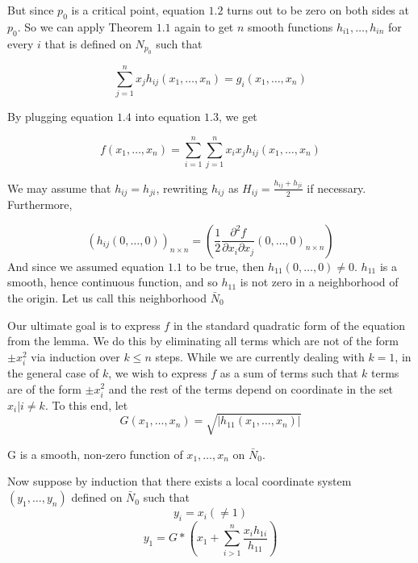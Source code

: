 \documentclass[]{article}
\begin{document}
     But since $p_0$ is a critical point, equation $1.2$ turns out to be zero on both 
     sides at $p_0$. So we can apply Theorem $1.1$ again to get $n$ smooth functions 
     $h_{i1},\ldots,h_{in}$ for every $i$ that is defined on $N_{p_0}$ such that

     \begin{equation}
        \sum_{j=1}^{n}{x_jh_{ij}(x_1,\ldots,x_n)}=g_i(x_1,\ldots,x_n) \tag{1.4}
     \end{equation}

     By plugging equation $1.4$ into equation $1.3$, we get

     \begin{equation}
        f(x_1,\ldots,x_n)=\sum_{i=1}^{n}\sum_{j=1}^{n}{x_ix_jh_{ij}(x_1,\ldots,x_n)} \tag{1.5}
     \end{equation}

     We may assume that $h_{ij}=h_{ji}$, rewriting $h_{ij}$ as
     $H_{ij}=\frac{h_{ij}+h_{ji}}{2}$ if necessary. Furthermore,

     \begin{equation}
        (h_{ij}(0,\ldots,0))_{n \times n}=\left( \frac{1}{2}\frac{\partial^2f}{\partial x_i \partial x_j}(0,\ldots,0)_{n\times n} \right) \tag{1.6}
     \end{equation} 
     And since we assumed equation $1.1$ to be true, then $h_{11}(0,\ldots,0)\not = 0$. $h_{11}$
     is a smooth, hence continuous function, and so $h_{11}$ is not zero in a neighborhood of the origin.
     Let us call this neighborhood $\bar{N}_0$    

     Our ultimate goal is to express $f$ in the standard quadratic form of the equation from the lemma.
     We do this by eliminating all terms which are not of the form $\pm x_i^2$ via induction over $k\le n$
     steps. While we are currently dealing with $k=1$, in the general case of $k$, we wish to express $f$ 
     as a sum of terms such that $k$ terms are of the form $\pm x_i^2$ and the rest of the terms depend
     on coordinate in the set ${x_i|i\not = k}$. To this end, let
     \begin{equation}
        G(x_1,\ldots,x_n)=\sqrt{|h_{11}(x_1,\ldots,x_n) | }   \tag{1.6}
     \end{equation}
        
     G is a smooth, non-zero function of $x_1,\ldots,x_n$ on $\bar{N}_0$.

     Now suppose by induction that there exists a local coordinate system $(y_1,\ldots,y_n)$ defined on $\bar{N}_0$ such that
     \begin{equation}
        y_i=x_i(\not = 1) \tag{1.7}
     \end{equation}
     \begin{equation}
        y_1=G*(x_1+\sum_{i>1}^{n}{\frac{x_ih_{1i}}{h_{11}}})\tag{1.8}
     \end{equation}
\end{document}
